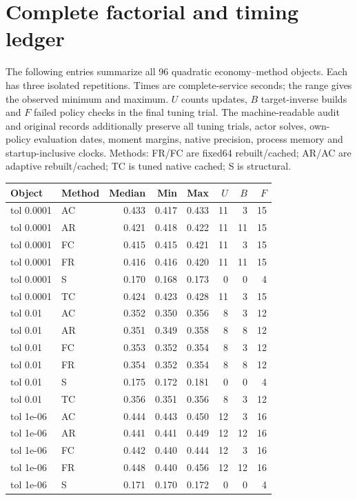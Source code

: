 \section{Complete factorial and timing ledger}\label{sec:r39ledger}
The following entries summarize all 96 quadratic economy--method objects. Each has three isolated repetitions. Times are complete-service seconds; the range gives the observed minimum and maximum. $U$ counts updates, $B$ target-inverse builds and $F$ failed policy checks in the final tuning trial. The machine-readable audit and original records additionally preserve all tuning trials, actor solves, own-policy evaluation dates, moment margins, native precision, process memory and startup-inclusive clocks. Methods: FR/FC are fixed64 rebuilt/cached; AR/AC are adaptive rebuilt/cached; TC is tuned native cached; S is structural.
\begin{longtable}{llrrrrrr}
\toprule Object & Method & Median & Min & Max & $U$ & $B$ & $F$\\\midrule\endhead
tol 0.0001 & AC & 0.433 & 0.417 & 0.433 & 11 & 3 & 15\\
tol 0.0001 & AR & 0.421 & 0.418 & 0.422 & 11 & 11 & 15\\
tol 0.0001 & FC & 0.415 & 0.415 & 0.421 & 11 & 3 & 15\\
tol 0.0001 & FR & 0.416 & 0.416 & 0.420 & 11 & 11 & 15\\
tol 0.0001 & S & 0.170 & 0.168 & 0.173 & 0 & 0 & 4\\
tol 0.0001 & TC & 0.424 & 0.423 & 0.428 & 11 & 3 & 15\\
tol 0.01 & AC & 0.352 & 0.350 & 0.356 & 8 & 3 & 12\\
tol 0.01 & AR & 0.351 & 0.349 & 0.358 & 8 & 8 & 12\\
tol 0.01 & FC & 0.353 & 0.352 & 0.354 & 8 & 3 & 12\\
tol 0.01 & FR & 0.354 & 0.352 & 0.354 & 8 & 8 & 12\\
tol 0.01 & S & 0.175 & 0.172 & 0.181 & 0 & 0 & 4\\
tol 0.01 & TC & 0.356 & 0.351 & 0.356 & 8 & 3 & 12\\
tol 1e-06 & AC & 0.444 & 0.443 & 0.450 & 12 & 3 & 16\\
tol 1e-06 & AR & 0.441 & 0.441 & 0.449 & 12 & 12 & 16\\
tol 1e-06 & FC & 0.442 & 0.440 & 0.444 & 12 & 3 & 16\\
tol 1e-06 & FR & 0.448 & 0.440 & 0.456 & 12 & 12 & 16\\
tol 1e-06 & S & 0.171 & 0.170 & 0.172 & 0 & 0 & 4\\

\end{longtable}
